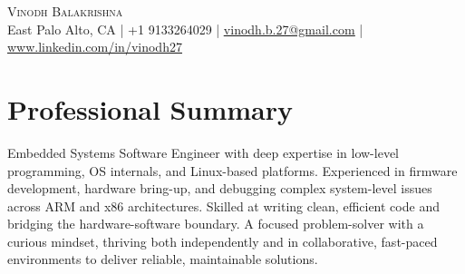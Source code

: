\documentclass[10pt, letterpad, sans]{extarticle}
\renewcommand{\maketitle}[6]{
	\begin{center}
	{\LARGE \scshape{#1}} \\
	\vspace*{0.25em}
		{#3} | {#4} | \href{mailto:#5}{\underline {#5}} | \href{https://#6}{\underline {#6}}
	\end{center}
}
\begin{document}
\maketitle
{Vinodh Balakrishna}
{Embedded Software Engineer | C \& C++ / Python / Rust Programmer | GNU/Linux Specialist}
{East Palo Alto, CA}
{+1 9133264029}
{vinodh.b.27@gmail.com}
{www.linkedin.com/in/vinodh27}

\thispagestyle{empty}

\section{Professional Summary}
\noindent\begin{minipage}{\textwidth}
Embedded Systems Software Engineer with deep expertise in low-level programming, OS internals, and Linux-based platforms. Experienced in firmware development, hardware bring-up, and debugging complex system-level issues across ARM and x86 architectures. Skilled at writing clean, efficient code and bridging the hardware-software boundary. A focused problem-solver with a curious mindset, thriving both independently and in collaborative, fast-paced environments to deliver reliable, maintainable solutions.
\end{minipage}
\end{document}
